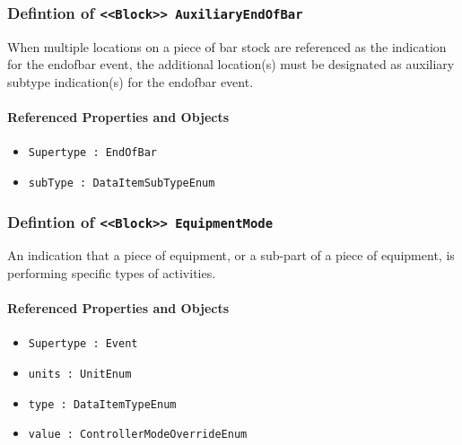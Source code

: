 \subsubsection{Defintion of \texttt{<<Block>> AuxiliaryEndOfBar}}
  \label{type:AuxiliaryEndOfBar}

\FloatBarrier

When multiple locations on a piece of bar stock are referenced as the indication for the endofbar event, the additional location(s) must be designated as auxiliary subtype indication(s) for the endofbar event.  

\FloatBarrier
\paragraph{Referenced Properties and Objects}

\begin{itemize}
\item \texttt{Supertype : EndOfBar}

\item \texttt{subType : DataItemSubTypeEnum}

\end{itemize}
\FloatBarrier
\subsubsection{Defintion of \texttt{<<Block>> EquipmentMode}}
  \label{type:EquipmentMode}

\FloatBarrier

An indication that a piece of equipment, or a sub-part of a piece of equipment, is performing specific types of activities.

\FloatBarrier
\paragraph{Referenced Properties and Objects}

\begin{itemize}
\item \texttt{Supertype : Event}

\item \texttt{units : UnitEnum}

\item \texttt{type : DataItemTypeEnum}

\item \texttt{value : ControllerModeOverrideEnum}

\end{itemize}
\FloatBarrier
